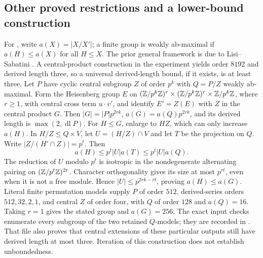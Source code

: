\subsection{Other proved restrictions and a lower-bound construction}

\label{partial:21.114}
For , write \(a(X)=|X/X'|\); a finite group is
weakly ab-maximal if \(a(H)\le a(X)\) for all \(H\le X\).
The prior general framework is due to Lisi--Sabatini
\cite{lisi-sabatini}. A central-product construction in the
experiment yields order \(8192\) and derived length three,
so a universal derived-length bound, if it exists, is at least three.
Let \(P\) have cyclic central subgroup \(Z\) of order \(p^k\)
with \(Q=P/Z\) weakly ab-maximal. Form the Heisenberg group
\(E\) on \((\mathbb Z/p^k\mathbb Z)^r\times(\mathbb Z/p^k\mathbb Z)^r\times\mathbb Z/p^k\mathbb Z\),
where \(r\ge1\),
with central cross term \(u\cdot v'\), and identify \(E'=Z(E)\)
with \(Z\) in the central product \(G\).
Then \(|G|=|P|p^{2rk}\), \(a(G)=a(Q)p^{2rk}\), and its
derived length is \(\max(2,\operatorname{dl}P)\).
For \(H\le G\), enlarge to \(HZ\), which can only increase \(a(H)\).
In \(H/Z\le Q\times V\), let \(U=(H/Z)\cap V\) and let \(T\)
be the projection on \(Q\). Write
\(|Z/(H'\cap Z)|=p^t\). Then
\[
 a(H)\le p^t|U|a(T)\le p^t|U|a(Q).
\]
The reduction of \(U\) modulo \(p^t\) is isotropic in the
nondegenerate alternating pairing on
\((\mathbb Z/p^t\mathbb Z)^{2r}\). Character orthogonality gives its size
at most \(p^{rt}\), even when it is not a free module.
Hence \(|U|\le p^{2rk-rt}\), proving \(a(H)\le a(G)\).
Literal finite permutation models supply \(P\) of order \(512\),
derived-series orders \(512,32,2,1\), and central \(Z\) of order
four, with \(Q\) of order \(128\) and \(a(Q)=16\).
Taking \(r=1\) gives the stated group and \(a(G)=256\).
The exact input checks enumerate every subgroup of the two
retained \(Q\)-models; they are recorded in
.
That file also proves that central extensions of these particular
outputs still have derived length at most three. Iteration of
this construction does not establish unboundedness.

